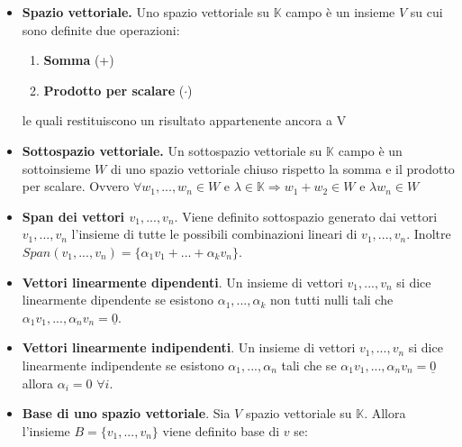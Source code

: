 \documentclass[12pt,a4paper,oneside]{book}
\begin{document}
\begin{itemize}

\item \textbf{Spazio vettoriale.} \linebreak
	  Uno spazio vettoriale su $\mathbb{K}$ campo è un insieme $V$ su cui sono definite due operazioni:

	  \begin{enumerate}
	  \item \textbf{Somma} (+)
	  \item \textbf{Prodotto per scalare} ($\cdot$)
	  \end{enumerate}

	  le quali restituiscono un risultato appartenente ancora a V

\item \textbf{Sottospazio vettoriale.}
	  \linebreak Un sottospazio vettoriale su $\mathbb{K}$ campo è un sottoinsieme $W$ di uno spazio 		
	  vettoriale chiuso rispetto la somma e il prodotto per scalare. Ovvero \break $\forall w_1, ..., w_n 
	  \in W$ e $\lambda \in \mathbb{K} \Rightarrow w_1+w_2 \in W$ e $\lambda w_n \in W$

\item \textbf{Span dei vettori $v_1, ..., v_n$}. \linebreak
	  Viene definito sottospazio generato dai vettori $v_1, ..., v_n$ l'insieme di tutte le possibili 
	  combinazioni lineari di $v_1, ..., v_n$. \hfill \break
	  Inoltre $Span(v_1, ..., v_n) = \{\alpha_1 v_1 + ... +\alpha_kv_n\}$.

\item \textbf{Vettori linearmente dipendenti}. \linebreak
	  Un insieme di vettori $v_1, ..., v_n$ si dice linearmente dipendente se esistono $\alpha_1, ..., 
	  \alpha_k$ non tutti nulli tali che $\alpha_1v_1, ..., \alpha_nv_n = \underline{0}$.

\item \textbf{Vettori linearmente indipendenti}. \linebreak 
	  Un insieme di vettori $v_1, ..., v_n$ si dice linearmente indipendente se esistono $\alpha_1, ..., 
	  \alpha_n$ tali che se $\alpha_1v_1, ..., \alpha_nv_n = \underline{0}$ allora  $\alpha_i = 0$ $
	  \forall i$.

\item \textbf{Base di uno spazio vettoriale}. \linebreak
	  Sia $V$ spazio vettoriale su $\mathbb{K}$. Allora l'insieme $B = \{v_1, ..., v_n\}$ viene definito 
	  base di $v$ se:
	

\end{itemize}
\end{document}

